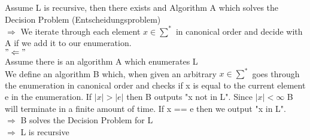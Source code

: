 \documentclass[8pt]{extreport}
\begin{document}
\begin{enumerate}
Assume L is recursive, then there exists and Algorithm A which solves the Decision Problem (Entscheidungsproblem)\\
$\Rightarrow$ We iterate through each element $x \in \sum^*$ in canonical order and decide with A if we add it to our enumeration.\\
\newline
$"\Leftarrow"$\\
Assume there is an algorithm A which enumerates L\\
We define an algorithm B which, when given an arbitrary $x \in \sum^*$ goes through the enumeration in canonical order and checks if x is equal to the current element e in the enumeration. If $|x| > |e|$ then B outputs "x not in L". Since $|x| < \infty$ B will terminate in a finite amount of time. If x == e then we output "x in L".\\
$\Rightarrow$ B solves the Decision Problem for L\\
$\Rightarrow$ L is recursive
\end{enumerate}
\end{document}
